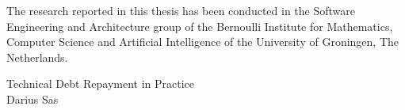 \thispagestyle{empty}
\noindent

The research reported in this thesis has been conducted in the Software Engineering and Architecture group of the Bernoulli Institute for Mathematics, Computer Science and Artificial Intelligence of the University of Groningen, The Netherlands. 

\vfill\vfill\vfill


\vspace*{\fill}

\noindent Technical Debt Repayment in Practice\\
\noindent Darius Sas\\

\normalsize
\newpage